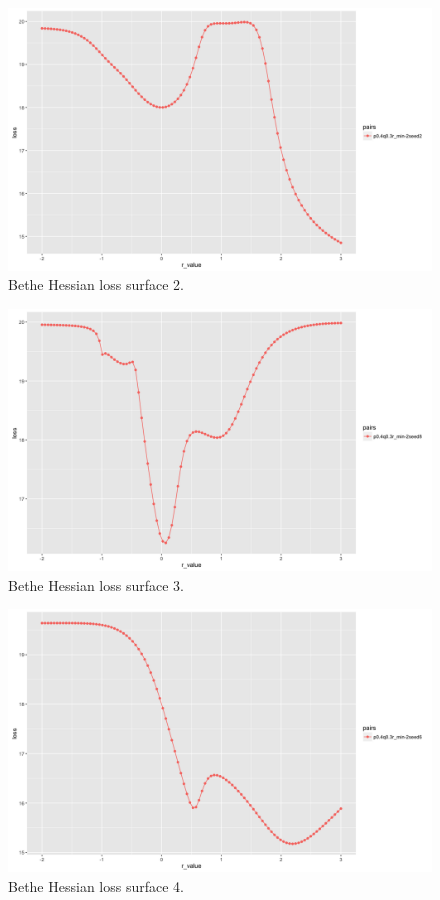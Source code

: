 \begin{figure}[H]
\begin{center}
\includegraphics[scale=0.4]{loss_surface_2.png}
\caption{Bethe Hessian loss surface 2.}
 \end{center}
\end{figure}

\begin{figure}[H]
\begin{center}
\includegraphics[scale=0.4]{loss_surface_3.png}
\caption{Bethe Hessian loss surface 3.}
 \end{center}
\end{figure}

\begin{figure}[H]
\begin{center}
\includegraphics[scale=0.4]{loss_surface_4.png}
\caption{Bethe Hessian loss surface 4.}
 \end{center}
\end{figure}
 
